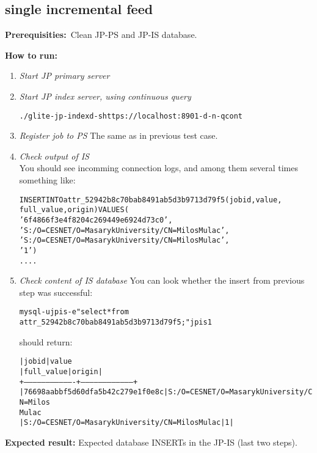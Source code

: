 \documentclass{egee}
\def\req{\noindent\textbf{Prerequisities:}}
\def\how{\noindent\textbf{How to run:}}
\def\result{\noindent\textbf{Expected result:}}
\begin{document}
\subsection{single incremental feed}

\req\ Clean JP-PS and JP-IS database.

\how\
\begin{enumerate}
 \item \emph{Start JP primary server}
 \item \emph{Start JP index server, using continuous query}
  \begin{alltt}
   ./glite-jp-indexd -s https://localhost:8901 -d -n -q cont
  \end{alltt}
 \item \emph{Register job to PS}
  The same as in previous test case.

 \item \emph{Check output of IS}\\
  You should see incomming connection logs, and among them
  several times something like:
  \begin{alltt}
    
   INSERT INTO attr_52942b8c70bab8491ab5d3b9713d79f5 (jobid, value,
                                        full_value, origin) VALUES (
     '6f4866f3e4f8204c269449e6924d73c0',
     'S:/O=CESNET/O=Masaryk University/CN=Milos Mulac',
     'S:/O=CESNET/O=Masaryk University/CN=Milos Mulac',
     '1')
   ....
  \end{alltt}
 \item \emph{Check content of IS database}
 You can look whether the insert from previous step was successful:
 \begin{alltt}
  mysql -u jpis -e "select * from
    attr_52942b8c70bab8491ab5d3b9713d79f5;" jpis1
 \end{alltt}
  should return:
 \begin{alltt}
| jobid                            | value
| full_value                                      | origin |
+----------------------------------+-----------------------------------+
| 76698aabbf5d60dfa5b42c279e1f0e8c | S:/O=CESNET/O=Masaryk University/CN=Milos
Mulac 
| S:/O=CESNET/O=Masaryk University/CN=Milos Mulac |      1 |
 \end{alltt}
\end{enumerate}
\result{} Expected database INSERTs in the JP-IS (last two steps).
\end{document}
